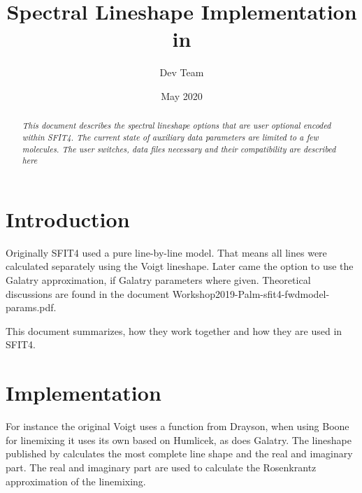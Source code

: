 \documentclass[12pt, letterpaper]{article}
\title{Spectral Lineshape Implementation in \sfi}
\author[1]{\sfi Dev Team}
\date{May 2020}
\newcommand{\sfi}{SFIT4\xspace}
\begin{document}
\begin{titlepage}

\maketitle
\thispagestyle{empty}
\pagestyle{empty}

\begin{abstract}
  \begin{adjustwidth}{2em}{2em} 
    \large{
      \emph{
\noindent This document describes the spectral lineshape options that are user optional encoded within \sfi.  The current state of auxiliary data parameters are limited to a few molecules.  The user switches, data files necessary and their compatibility are described here
}}
      
  \end{adjustwidth}

\end{abstract}

\end{titlepage}
 
\tableofcontents 

\pagebreak

\section{Introduction} 
\label{sec:intro}

Originally SFIT4 used a pure line-by-line model. That means all lines
were calculated separately using the Voigt lineshape. Later came the
option to use the Galatry approximation, if Galatry parameters where
given. Theoretical discussions are found in the document
Workshop2019-Palm-sfit4-fwdmodel-params.pdf.

This document summarizes, how they work together and how they are used in SFIT4.

\section{Implementation} 
\label{sec:implement}

For instance the original Voigt uses a function from Drayson, when
using Boone for linemixing it uses its own based on Humlicek, as does
Galatry.  The lineshape published by \cite{Tran:2013} calculates the
most complete line shape and the real and imaginary part. The real and
imaginary part are used to calculate the Rosenkrantz approximation of
the linemixing.
\end{document}
